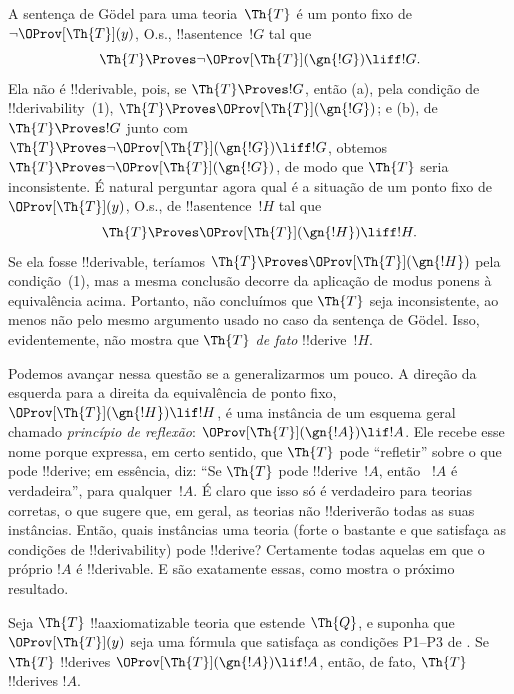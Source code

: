 \documentclass[../../../include/open-logic-section]{subfiles}
\begin{document}


A sentença de G\"odel para uma teoria~$\Th{T}$ é um ponto fixo de $\lnot
\OProv[\Th{T}](y)$, O.s.\@, !!a{sentence}~$!G$ tal que
\[
\Th{T} \Proves \lnot \OProv[\Th{T}](\gn{!G}) \liff !G.
\]
Ela não é !!{derivable}, pois, se $\Th{T} \Proves !G$, então (a), pela
condição de !!{derivability}~(1),
$\Th{T} \Proves \OProv[\Th{T}](\gn{!G})$; e (b), de
$\Th{T} \Proves !G$ junto com
$\Th{T} \Proves \lnot \OProv[\Th{T}](\gn{!G}) \liff !G$, obtemos
$\Th{T} \Proves \lnot \OProv[\Th{T}](\gn{!G})$, de modo que $\Th{T}$
seria inconsistente. É natural perguntar agora qual é a situação de um ponto
fixo de $\OProv[\Th{T}](y)$, O.s.\@, de !!a{sentence}~$!H$ tal que
\[
\Th{T} \Proves \OProv[\Th{T}](\gn{!H}) \liff !H.
\]
Se ela fosse !!{derivable}, teríamos
$\Th{T} \Proves \OProv[\Th{T}](\gn{!H})$ pela condição~(1), mas a mesma
conclusão decorre da aplicação de modus ponens à equivalência acima.
Portanto, não concluímos que $\Th{T}$ seja inconsistente, ao menos não pelo
mesmo argumento usado no caso da sentença de G\"odel. Isso, evidentemente,
não mostra que $\Th{T}$ \emph{de fato} !!{derive}~$!H$.

Podemos avançar nessa questão se a generalizarmos um pouco. A direção da
esquerda para a direita da equivalência de ponto fixo,
$\OProv[\Th{T}](\gn{!H}) \lif !H$, é uma instância de um esquema geral
chamado \emph{princípio de reflexão}:
$\OProv[\Th{T}](\gn{!A}) \lif !A$. Ele recebe esse nome porque expressa,
em certo sentido, que $\Th{T}$ pode ``refletir'' sobre o que pode
!!{derive}; em essência, diz: ``Se $\Th{T}$ pode !!{derive}~$!A$, então
~$!A$ é verdadeira'', para qualquer~$!A$. É claro que isso só é verdadeiro
para teorias corretas, o que sugere que, em geral, as teorias não
!!{derive}rão todas as suas instâncias. Então, quais instâncias uma teoria
(forte o bastante e que satisfaça as condições de !!{derivability}) pode
!!{derive}? Certamente todas aquelas em que o próprio $!A$ é
!!{derivable}. E são exatamente essas, como mostra o próximo resultado.

\begin{thm}
Seja $\Th{T}$ !!a{axiomatizable} teoria que estende $\Th{Q}$, e suponha que
$\OProv[\Th{T}](y)$ seja uma fórmula que satisfaça as condições P1--P3 de
. Se $\Th{T}$ !!{derive}s
$\OProv[\Th{T}](\gn{!A}) \lif !A$, então, de fato, $\Th{T}$ !!{derive}s
$!A$.
\end{thm}
\end{document}
